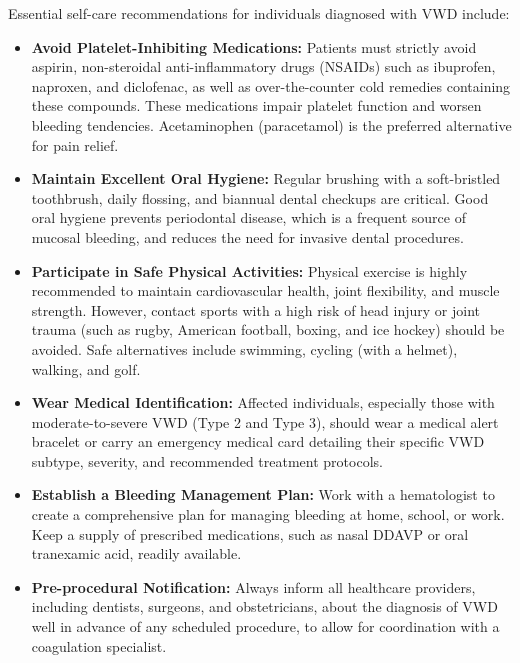 Essential self-care recommendations for individuals diagnosed with VWD include:
\begin{itemize}
    \item \textbf{Avoid Platelet-Inhibiting Medications:} Patients must strictly avoid aspirin, non-steroidal anti-inflammatory drugs (NSAIDs) such as ibuprofen, naproxen, and diclofenac, as well as over-the-counter cold remedies containing these compounds. These medications impair platelet function and worsen bleeding tendencies. Acetaminophen (paracetamol) is the preferred alternative for pain relief.
    \item \textbf{Maintain Excellent Oral Hygiene:} Regular brushing with a soft-bristled toothbrush, daily flossing, and biannual dental checkups are critical. Good oral hygiene prevents periodontal disease, which is a frequent source of mucosal bleeding, and reduces the need for invasive dental procedures.
    \item \textbf{Participate in Safe Physical Activities:} Physical exercise is highly recommended to maintain cardiovascular health, joint flexibility, and muscle strength. However, contact sports with a high risk of head injury or joint trauma (such as rugby, American football, boxing, and ice hockey) should be avoided. Safe alternatives include swimming, cycling (with a helmet), walking, and golf.
    \item \textbf{Wear Medical Identification:} Affected individuals, especially those with moderate-to-severe VWD (Type 2 and Type 3), should wear a medical alert bracelet or carry an emergency medical card detailing their specific VWD subtype, severity, and recommended treatment protocols.
    \item \textbf{Establish a Bleeding Management Plan:} Work with a hematologist to create a comprehensive plan for managing bleeding at home, school, or work. Keep a supply of prescribed medications, such as nasal DDAVP or oral tranexamic acid, readily available.
    \item \textbf{Pre-procedural Notification:} Always inform all healthcare providers, including dentists, surgeons, and obstetricians, about the diagnosis of VWD well in advance of any scheduled procedure, to allow for coordination with a coagulation specialist.
\end{itemize}

